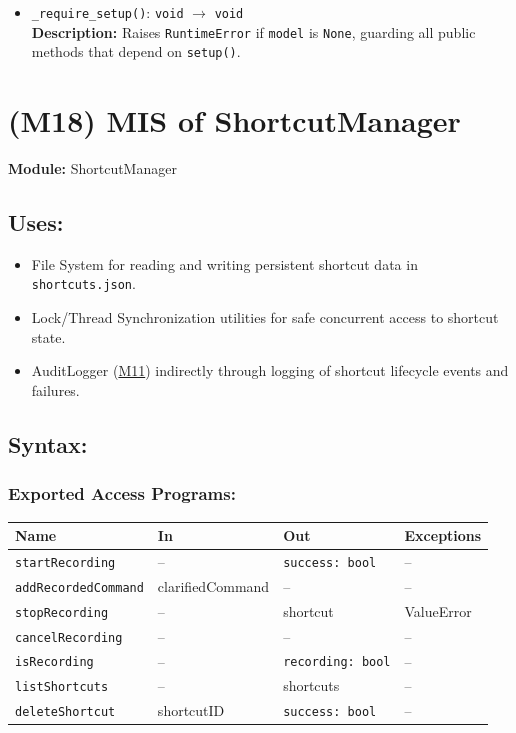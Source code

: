\documentclass[12pt, titlepage]{article}
\begin{document}
\begin{itemize}
  \item \texttt{\_require\_setup()}: \texttt{void} $\rightarrow$ \texttt{void} \\
  \textbf{Description:} Raises \texttt{RuntimeError} if \texttt{model} is \texttt{None}, guarding all public methods that depend on \texttt{setup()}.
\end{itemize}


\label{MIS:M18}

\section{(M18) MIS of ShortcutManager} \label{M18}

\textbf{Module:} ShortcutManager

\subsection{Uses:}
\begin{itemize}
\item File System for reading and writing persistent shortcut data in \texttt{shortcuts.json}.
\item Lock/Thread Synchronization utilities for safe concurrent access to shortcut state.
\item AuditLogger (\hyperref[M11]{M11}) indirectly through logging of shortcut lifecycle events and failures.
\end{itemize}

\subsection{Syntax:}

\subsubsection{Exported Access Programs:}

\begin{tabular}{|l|l|l|l|}
\hline
\textbf{Name} & \textbf{In} & \textbf{Out} & \textbf{Exceptions} \\ \hline
\texttt{startRecording} & -- & \texttt{success: bool} & -- \\ 
\texttt{addRecordedCommand} & clarifiedCommand & -- & -- \\ 
\texttt{stopRecording} & -- & shortcut & ValueError \\ 
\texttt{cancelRecording} & -- & -- & -- \\ 
\texttt{isRecording} & -- & \texttt{recording: bool} & -- \\ 
\texttt{listShortcuts} & -- & shortcuts & -- \\ 
\texttt{deleteShortcut} & shortcutID & \texttt{success: bool} & -- \\ \hline
\end{tabular}
\end{document}
